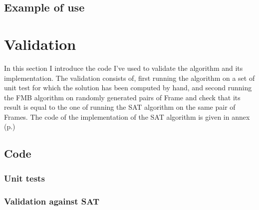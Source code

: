 \documentclass[12pt, a4paper]{article}
\begin{document}
\subsection{Example of use}

\begin{scriptsize}
\begin{ttfamily}

\end{ttfamily}
\end{scriptsize}

\section{Validation}

In this section I introduce the code I've used to validate the algorithm and its implementation. The validation consists of, first running the algorithm on a set of unit test for which the solution has been computed by hand, and second running the FMB algorithm on randomly generated pairs of Frame and check that its result is equal to the one of running the SAT algorithm on the same pair of Frames. The code of the implementation of the SAT algorithm is given in annex (p.\pageref{sat_implementation})\\

\subsection{Code}

\subsubsection{Unit tests}

\begin{scriptsize}
\begin{ttfamily}

\end{ttfamily}
\end{scriptsize}

\subsubsection{Validation against SAT}

\begin{scriptsize}
\begin{ttfamily}

\end{ttfamily}
\end{scriptsize}
\end{document}
